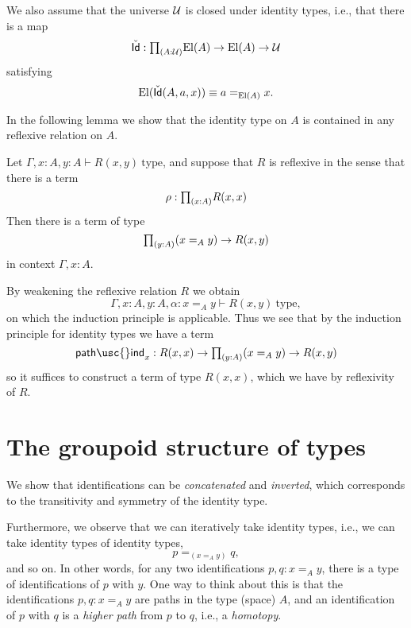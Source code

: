 We also assume that the universe $\mathcal{U}$ is closed under identity types, i.e., that there is a map
\begin{equation*}
\check{\mathsf{Id}}:\prd{A:\UU}\mathrm{El}(A)\to\mathrm{El}(A)\to\UU
\end{equation*}
satisfying
\begin{equation*}
\mathrm{El}(\check{\mathsf{Id}}(A,a,x))\equiv a=_{\mathrm{El}(A)} x.
\end{equation*}

In the following lemma we show that the identity type on $A$ is contained in any reflexive relation on $A$.

\begin{lem}
Let $\Gamma,x:A,y:A\vdash R(x,y)~\mathrm{type}$, and suppose that $R$ is reflexive in the sense that there is a term
\begin{equation*}
\rho:\prd{x:A}R(x,x)
\end{equation*}
Then there is a term of type
\begin{equation*}
\prd{y:A} (x=_A y)\to R(x,y)
\end{equation*}
in context $\Gamma,x:A$.
\end{lem}

\begin{constr}
By weakening the reflexive relation $R$ we obtain
\begin{equation*}
\Gamma,x:A,y:A,\alpha:x=_A y\vdash R(x,y)~\mathrm{type},
\end{equation*}
on which the induction principle is applicable.
Thus we see that by the induction principle for identity types we have a term
\begin{equation*}
\mathsf{path\usc{}ind}_x : R(x,x)\to \prd{y:A}(x=_A y)\to R(x,y)
\end{equation*}
so it suffices to construct a term of type $R(x,x)$, which we have by reflexivity of $R$.
\end{constr}

\section{The groupoid structure of types}\label{sec:groupoid}
We show that identifications can be \emph{concatenated} and \emph{inverted}, which corresponds to the transitivity and symmetry of the identity type. 

Furthermore, we observe that we can iteratively take identity types, i.e., we can take identity types of identity types, 
\begin{equation*}
p =_{(x=_Ay)} q,
\end{equation*}
and so on. In other words, for any two identifications $p,q:x=_A y$, there is a type of identifications of $p$ with $y$. One way to think about this is that the identifications $p,q:x=_A y$ are paths in the type (space) $A$, and an identification of $p$ with $q$ is a \emph{higher path} from $p$ to $q$, i.e., a \emph{homotopy}.

